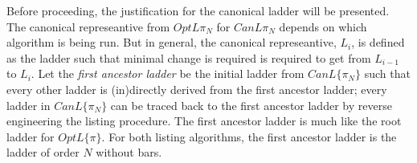 Before proceeding, the justification for the canonical ladder will be presented. 
The canonical represeantive from $OptL{\pi_{N}}$ for $CanL{\pi_{N}}$ depends 
on which algorithm is being run. But in general, the canonical represeantive, $L_{i}$, is defined as the ladder 
such that minimal change is required is required to get from $L_{i-1}$ to $L_{i}$. 
Let the \emph{first ancestor ladder} be the initial ladder 
from $CanL\{\pi_{N}\}$ such that every other ladder is (in)directly derived from the 
first ancestor ladder; every ladder in $CanL\{\pi_{N}\}$ can be traced back to the first ancestor 
ladder by reverse engineering the listing procedure. The first ancestor ladder is much like the 
root ladder for $OptL\{\pi\}$. For both listing algorithms, the first ancestor ladder is the 
ladder of order $N$ without bars.
